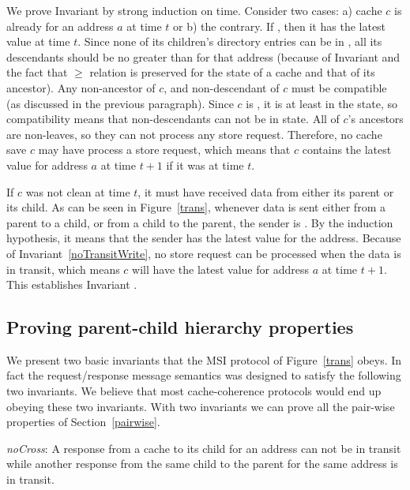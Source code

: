 We prove Invariant  by strong induction on time. Consider
two cases: a) cache $c$ is already \clean{} for an address $a$ at time $t$ or
b) the contrary.  If \clean{}, then it has the latest value at time $t$. Since
none of its children's directory entries can be in \Mo{}, all its descendants
should be no greater than \Sh{} for that address (because of Invariant
 and the fact that $\ge$ relation is preserved for the
state of a cache and that of its ancestor). Any non-ancestor of $c$, and
non-descendant of $c$ must be compatible (as discussed in the previous
paragraph).  Since $c$ is \clean, it is at least in the \Sh{} state, so
compatibility means that non-descendants can not be in \Mo{} state. All of
$c$'s ancestors are non-leaves, so they can not process any store request.
Therefore, no cache save $c$ may have process a store request, which means that
$c$ contains the latest value for address $a$ at time $t+1$ if it was \clean{}
at time $t$.

If $c$ was not clean at time $t$, it must have received data from either its
parent or its child.  As can be seen in Figure~\ref{trans}, whenever data is
sent either from a parent to a child, or from a child to the parent, the sender
is \clean. By the induction hypothesis, it means that the sender has the latest
value for the address. Because of Invariant~\ref{noTransitWrite}, no store
request can be processed when the data is in transit, which means $c$ will have
the latest value for address $a$ at time $t+1$. This establishes Invariant
.

\subsection{Proving parent-child hierarchy properties}


We present two basic invariants that the MSI protocol of Figure~\ref{trans}
obeys. In fact the request/response message semantics was designed to satisfy
the following two invariants. We believe that most cache-coherence protocols
would end up obeying these two invariants. With two invariants we can
prove all the pair-wise properties of Section~\ref{pairwise}.

\begin{inv}
\textit{noCross}: A response from a cache to its child for an address can not
be in transit while another response from the same child to the parent for the
same address is in transit.
\label{noCross}
\end{inv}


